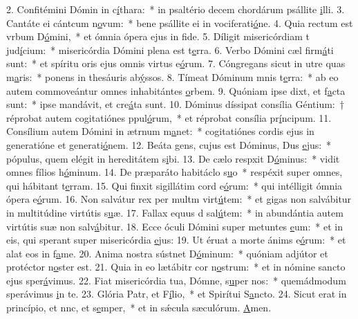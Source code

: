 2. Confitémini Dómin in c\uline{í}thara:~* in psaltério decem chordárum psállite \uline{i}lli.
3. Cantáte ei cántcum n\uline{o}vum:~* bene psállite ei in vociferati\uline{ó}ne.
4. Quia rectum est vrbum D\uline{ó}mini,~* et ómnia ópera ejus in f\uline{i}de.
5. Díligit misericórdiam t jud\uline{í}cium:~* misericórdia Dómini plena est t\uline{e}rra.
6. Verbo Dómini cæl firm\uline{á}ti sunt:~* et spíritu oris ejus omnis virtus e\uline{ó}rum.
7. Cóngregans sicut in utre quas m\uline{a}ris:~* ponens in thesáuris ab\uline{ý}ssos.
8. Tímeat Dóminum mnis t\uline{e}rra:~* ab eo autem commoveántur omnes inhabitántes \uline{o}rbem.
9. Quóniam ipse dixt, et f\uline{a}cta sunt:~* ipse mandávit, et cre\uline{á}ta sunt.
10. Dóminus díssipat consília Géntium:~† réprobat autem cogitatiónes ppul\uline{ó}rum,~* et réprobat consília pr\uline{í}ncipum.
11. Consílium autem Dómini in ætrnum m\uline{a}net:~* cogitatiónes cordis ejus in generatióne et generati\uline{ó}nem.
12. Beáta gens, cujus est Dóminus, Dus \uline{e}jus:~* pópulus, quem elégit in hereditátem s\uline{i}bi.
13. De cælo respxit D\uline{ó}minus:~* vidit omnes fílios h\uline{ó}minum.
14. De præparáto habitáclo s\uline{u}o~* respéxit super omnes, qui hábitant t\uline{e}rram.
15. Qui finxit sigillátim cord e\uline{ó}rum:~* qui intélligit ómnia ópera e\uline{ó}rum.
16. Non salvátur rex per multm virt\uline{ú}tem:~* et gigas non salvábitur in multitúdine virtútis s\uline{u}æ.
17. Fallax equus d sal\uline{ú}tem:~* in abundántia autem virtútis suæ non salv\uline{á}bitur.
18. Ecce óculi Dómini super metuntes \uline{e}um:~* et in eis, qui sperant super misericórdia \uline{e}jus:
19. Ut éruat a morte ánims e\uline{ó}rum:~* et alat eos in f\uline{a}me.
20. Anima nostra sústnet D\uline{ó}minum:~* quóniam adjútor et protéctor n\uline{o}ster est.
21. Quia in eo lætábitr cor n\uline{o}strum:~* et in nómine sancto ejus sper\uline{á}vimus.
22. Fiat misericórdia tua, Dómne, s\uline{u}per nos:~* quemádmodum sperávimus \uline{i}n te.
23. Glória Patr, et F\uline{í}lio,~* et Spirítui S\uline{a}ncto.
24. Sicut erat in princípio, et nnc, et s\uline{e}mper,~* et in sǽcula sæculórum. \uline{A}men.
